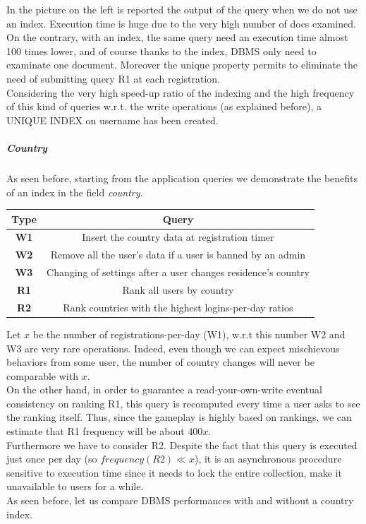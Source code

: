 In the picture on the left is reported the output of the query when we do not use an index. Execution time is huge due to the very high number of docs examined. On the contrary, with an index, the same query need an execution time almost 100 times lower, and of course thanks to the index, DBMS only need to examinate one document. Moreover the unique property permits to eliminate the need of submitting query R1 at each registration.\\
Considering the very high speed-up ratio of the indexing and the high frequency of this kind of queries w.r.t. the write operations (as explained before), a UNIQUE INDEX on username has been created.

\subparagraph{Country}
As seen before, starting from the application queries we demonstrate the benefits of an index in the field \textit{country}.

\begin{center}
	\begin{tabular}{|c | c |} 
		\hline
		\textbf{Type} & \textbf{Query} \\ [0.5ex] 
		\hline
		\textbf{W1} & Insert the country data at registration timer \\ 
		\hline
		\textbf{W2} & Remove all the user’s data if a user is banned by an admin \\
		\hline
		\textbf{W3} & Changing of settings after a user changes residence’s country \\
		\hline
		\textbf{R1} & Rank all users by country \\
		\hline
		\textbf{R2} & Rank countries with the highest logins-per-day ratios \\
		\hline
	\end{tabular}
\end{center}

Let $x$ be the number of registrations-per-day (W1), w.r.t this number W2 and W3 are very rare operations. Indeed, even though we can expect mischievous behaviors from some user, the number of country changes will never be comparable with $x$.\\
On the other hand, in order to guarantee a read-your-own-write eventual consistency on ranking R1, this query is recomputed every time a user asks to see the ranking itself. Thus, since the gameplay is highly based on rankings, we can estimate that R1 frequency will be about $400x$.\\
Furthermore we have to consider R2. Despite the fact that this query is executed just once per day (so $frequency(R2) \ll x$), it is an asynchronous procedure sensitive to execution time since it needs to lock the entire collection, make it unavailable to users for a while.\\
As seen before, let us compare DBMS performances with and without a country index.

